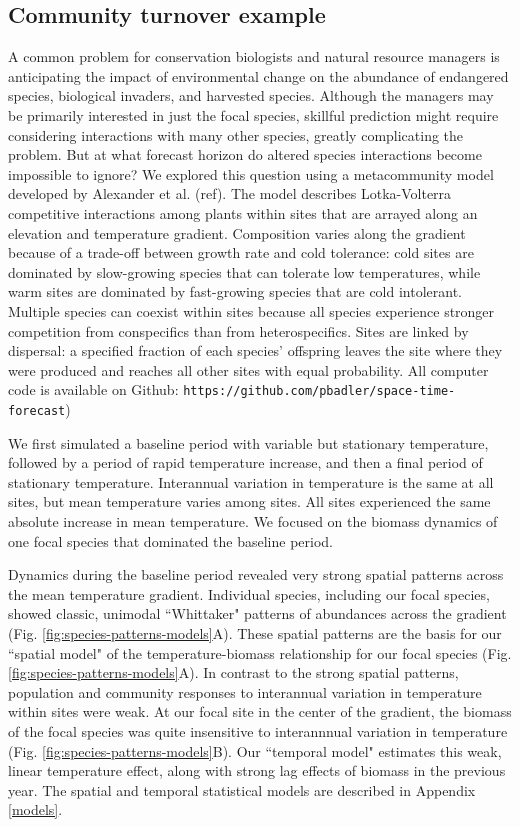 \documentclass[11pt]{article}
\begin{document}
\subsection*{Community turnover example}

A common problem for conservation biologists and natural resource managers is anticipating the impact of environmental change on the abundance of 
endangered species, biological invaders, and harvested species. Although the managers may be primarily interested in just the focal species, 
skillful prediction might require considering interactions with many other species, greatly complicating the problem. But at what forecast horizon do
altered species interactions become impossible to ignore? We explored this question using a metacommunity model developed by Alexander et al. (ref). 
The model describes Lotka-Volterra competitive interactions among plants within sites that are arrayed along an elevation and temperature gradient.
Composition varies along the gradient because of a trade-off between growth rate and cold tolerance: 
cold sites are dominated by slow-growing species that can tolerate low temperatures, while warm sites are dominated by 
fast-growing species that are cold intolerant. Multiple species can coexist within sites because all species experience stronger competition from conspecifics than from heterospecifics. 
Sites are linked by dispersal: a specified fraction of each species' offspring leaves the site where they were produced and reaches all other sites with equal probability. All computer code is available on Github: \texttt{https://github.com/pbadler/space-time-forecast})

We first simulated a baseline period with variable but stationary temperature, followed by a period of rapid temperature increase, and then a 
final period of stationary temperature. Interannual variation in temperature is the same at all sites, but mean temperature varies among sites. All sites experienced the 
same absolute increase in mean temperature. We focused on the biomass dynamics of one focal species that dominated the baseline period.

Dynamics during the baseline period revealed very strong spatial patterns across the mean temperature gradient. 
Individual species, including our focal species, showed classic, unimodal ``Whittaker" patterns of abundances across the gradient (Fig. \ref{fig:species-patterns-models}A).
These spatial patterns are the basis for our ``spatial model" of the temperature-biomass relationship for our focal species (Fig. \ref{fig:species-patterns-models}A). 
In contrast to the strong spatial patterns, population and community responses to interannual variation in temperature within sites were weak.
At our focal site in the center of the gradient, the biomass of the focal species was quite insensitive to interannnual variation in temperature (Fig. \ref{fig:species-patterns-models}B). Our ``temporal model" estimates this weak, linear temperature effect, along with strong lag effects of biomass in the previous year. The spatial and temporal statistical
models are described in Appendix \ref{models}.
\end{document}
